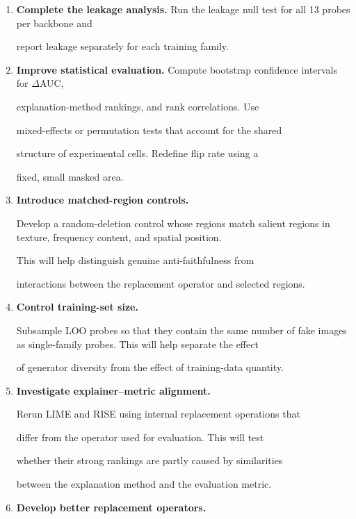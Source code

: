 \begin{enumerate}

    \item \textbf{Complete the leakage analysis.}
    Run the leakage null test for all 13 probes per backbone and

    report leakage separately for each training family.


    \item \textbf{Improve statistical evaluation.}
    Compute bootstrap confidence intervals for $\Delta$AUC,

    explanation-method rankings, and rank correlations. Use

    mixed-effects or permutation tests that account for the shared

    structure of experimental cells. Redefine flip rate using a

    fixed, small masked area.


    \item \textbf{Introduce matched-region controls.}

    Develop a random-deletion control whose regions match salient
    regions in texture, frequency content, and spatial position.

    This will help distinguish genuine anti-faithfulness from

    interactions between the replacement operator and selected regions.


    \item \textbf{Control training-set size.}

    Subsample LOO probes so that they contain the same number of fake
    images as single-family probes. This will help separate the effect

    of generator diversity from the effect of training-data quantity.


    \item \textbf{Investigate explainer--metric alignment.}

    Rerun LIME and RISE using internal replacement operations that

    differ from the operator used for evaluation. This will test

    whether their strong rankings are partly caused by similarities

    between the explanation method and the evaluation metric.


    \item \textbf{Develop better replacement operators.}


\end{enumerate}
